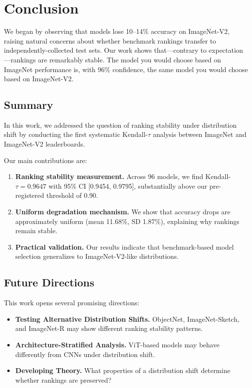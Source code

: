 \section{Conclusion}
\label{sec:conclusion}

We began by observing that models lose 10--14\% accuracy on ImageNet-V2, raising natural concerns about whether benchmark rankings transfer to independently-collected test sets. Our work shows that---contrary to expectation---rankings are remarkably stable. The model you would choose based on ImageNet performance is, with 96\% confidence, the same model you would choose based on ImageNet-V2.

\subsection{Summary}

In this work, we addressed the question of ranking stability under distribution shift by conducting the first systematic Kendall-$\tau$ analysis between ImageNet and ImageNet-V2 leaderboards.

Our main contributions are:

\begin{enumerate}
    \item \textbf{Ranking stability measurement.} Across 96 models, we find Kendall-$\tau = 0.9647$ with 95\% CI [0.9454, 0.9795], substantially above our pre-registered threshold of 0.90.
    \item \textbf{Uniform degradation mechanism.} We show that accuracy drops are approximately uniform (mean 11.68\%, SD 1.87\%), explaining why rankings remain stable.
    \item \textbf{Practical validation.} Our results indicate that benchmark-based model selection generalizes to ImageNet-V2-like distributions.
\end{enumerate}

\subsection{Future Directions}

This work opens several promising directions:

\begin{itemize}
    \item \textbf{Testing Alternative Distribution Shifts.} ObjectNet, ImageNet-Sketch, and ImageNet-R may show different ranking stability patterns.
    \item \textbf{Architecture-Stratified Analysis.} ViT-based models may behave differently from CNNs under distribution shift.
    \item \textbf{Developing Theory.} What properties of a distribution shift determine whether rankings are preserved?
\end{itemize}

